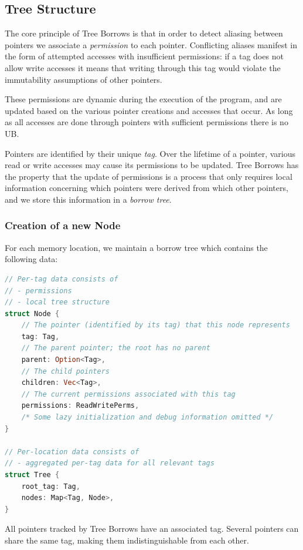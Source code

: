 \documentclass[a4paper,11pt]{article}
\theoremstyle{plain}
\theoremstyle{definition}
\theoremstyle{remark}
\begin{document}
\subsection{Tree Structure}
\label{sec:tree-structure}

The core principle of Tree Borrows is that in order to detect aliasing between
pointers we associate a \textit{permission} to each pointer. Conflicting aliases
manifest in the form of attempted accesses with insufficient permissions: if
a tag does not allow write accesses it means that writing through this tag
would violate the immutability assumptions of other pointers.

These permissions are dynamic during the execution of the program, and are
updated based on the various pointer creations and accesses that occur. As
long as all accesses are done through pointers with sufficient permissions there
is no UB.

Pointers are identified by their unique \textit{tag}. Over the lifetime of a pointer,
various read or write accesses may cause its permissions to be updated.
Tree Borrows has the property that the update of permissions is a process
that only requires local information concerning which pointers were derived from
which other pointers, and we store this information in a \textit{borrow tree}.

\subsubsection{Creation of a new Node}

For each memory location, we maintain a borrow tree which contains
the following data:
\begin{lstlisting}[language=rust]
// Per-tag data consists of
// - permissions
// - local tree structure
struct Node {
    // The pointer (identified by its tag) that this node represents
    tag: Tag,
    // The parent pointer; the root has no parent
    parent: Option<Tag>,
    // The child pointers
    children: Vec<Tag>,
    // The current permissions associated with this tag
    permissions: ReadWritePerms,
    /* Some lazy initialization and debug information omitted */
}

// Per-location data consists of
// - aggregated per-tag data for all relevant tags
struct Tree {
    root_tag: Tag,
    nodes: Map<Tag, Node>,
}
\end{lstlisting}

All pointers tracked by Tree Borrows have an associated tag. Several pointers
can share the same tag, making them indistinguishable from each other.
\end{document}
